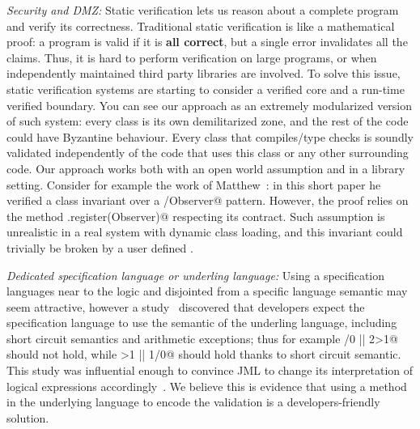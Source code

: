\noindent\textit{Security and DMZ:}
Static verification lets us reason about a complete program
and verify its correctness.
Traditional static verification is like a mathematical proof: a program is valid if it is \textbf{all correct},
but a single error invalidates all the claims.
Thus, it is hard to perform verification on large programs, or when independently
maintained third party libraries are involved.
To solve this issue, static verification systems are starting to consider a verified core
and a run-time verified boundary.
You can see our approach as an extremely modularized version of such system:
every class is its own demilitarized zone, and the rest of the code 
could have Byzantine behaviour.
Every class that compiles/type checks is soundly validated
independently of the code that uses this class or any other surrounding code.
Our approach works both with an open world assumption and in a library setting.
Consider for example the work of Matthew~\cite{parkinson2007class}:
in this short paper he verified a \Q@Observer@ class invariant over
a \Q@Subject/Observer@ pattern.
However, the proof relies on the method \Q@Subject.register(Observer)@ respecting its contract.
Such assumption is unrealistic in a real system with dynamic class loading,
and this invariant could trivially be broken by a user defined \Q@EvilSubject@.


\noindent\textit{Dedicated specification language or underling language:}
Using a specification languages near to the logic and disjointed from a specific language
semantic may seem attractive, however
a study~\cite{chalin2007logical} discovered that developers expect
the specification language to use the semantic of the underling language, including
short circuit semantics and arithmetic exceptions; thus for example
/0 || 2>1@
should not hold, while 
>1 || 1/0@ should hold thanks to short circuit semantic.
This study was influential enough to convince JML to change its interpretation of logical expressions
accordingly~\cite{chalin2008jml}.
We believe this is evidence that using a method in the underlying language to encode the validation is
a developers-friendly solution.









